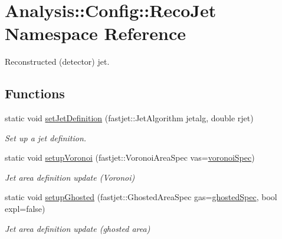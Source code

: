 \hypertarget{namespaceAnalysis_1_1Config_1_1RecoJet}{}\section{Analysis\+:\+:Config\+:\+:Reco\+Jet Namespace Reference}
\label{namespaceAnalysis_1_1Config_1_1RecoJet}


Reconstructed (detector) jet.  


\subsection*{Functions}
\begin{DoxyCompactItemize}
\item 
static void \hyperlink{namespaceAnalysis_1_1Config_1_1RecoJet_a57809760613f058ed73218ccb272b948}{set\+Jet\+Definition} (fastjet\+::\+Jet\+Algorithm jetalg, double rjet)
\begin{DoxyCompactList}\small\item\em Set up a jet definition. \end{DoxyCompactList}\item 
static void \hyperlink{namespaceAnalysis_1_1Config_1_1RecoJet_a4fc6b347f3137794f8a2083cfadfe1ab}{setup\+Voronoi} (fastjet\+::\+Voronoi\+Area\+Spec vas=\hyperlink{namespaceAnalysis_1_1Config_1_1RecoJet_a851b86d5a4096ee867e561f0489a4062}{voronoi\+Spec})
\begin{DoxyCompactList}\small\item\em Jet area definition update (Voronoi) \end{DoxyCompactList}\item 
static void \hyperlink{namespaceAnalysis_1_1Config_1_1RecoJet_a763aa07f1bb2f03fe29298a77f0a0c68}{setup\+Ghosted} (fastjet\+::\+Ghosted\+Area\+Spec gas=\hyperlink{namespaceAnalysis_1_1Config_1_1RecoJet_a319c43bb7084593808400c0ac0b2f5a6}{ghosted\+Spec}, bool expl=false)
\begin{DoxyCompactList}\small\item\em Jet area definition update (ghosted area) \end{DoxyCompactList}\end{DoxyCompactItemize}
